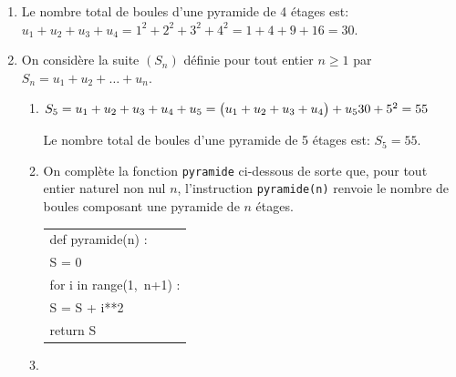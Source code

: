 \documentclass[10pt]{article}
\providecommand{\blue}{\color{blue}}
\providecommand{\blue}{\color{blue}}
\begin{document}
\begin{enumerate}
\item Le nombre total de boules d'une pyramide de 4 étages est:\\
$u_1+u_2+u_3+u_4=1^2+2^2+3^2+4^2=1+4+9+16=30$.

\item On considère la suite $\left(S_n\right)$ définie pour tout entier $n \geqslant 1$ par 
$S_n = u_1 + u_2 + \ldots + u_n.$

	\begin{enumerate}
		\item $S_5 = u_1+u_2+u_3+u_4+u_5  = \left ( u_1+u_2+u_3+u_4 \strut\right ) +u_5 30+5^2 = 55$
		
Le nombre total de boules d'une pyramide de 5 étages est: $S_5=55$.
		 		 
		\item
		
On complète la fonction \texttt{pyramide} ci-dessous de sorte que, pour tout entier naturel non nul $n$, l'instruction \texttt{pyramide(n)} renvoie le nombre de boules composant une pyramide de $n$ étages.

\begin{center}
\ttfamily
\begin{tabular}{|l|}\hline
def pyramide(n) :\\
\qquad S = 0\\
\qquad for i in range(1,~n+1) :\\
\qquad \qquad S =  \blue S + i**2\\
\qquad return \blue S\\ \hline
\end{tabular}
\end{center}

		\item 
{}		
		

\end{enumerate}
\end{enumerate}
\end{document}
